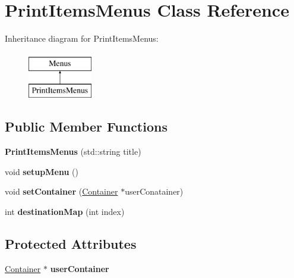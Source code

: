 \hypertarget{class_print_items_menus}{}\section{Print\+Items\+Menus Class Reference}
\label{class_print_items_menus}
Inheritance diagram for Print\+Items\+Menus\+:\begin{figure}[H]
\begin{center}
\leavevmode
\includegraphics[height=2.000000cm]{class_print_items_menus}
\end{center}
\end{figure}
\subsection*{Public Member Functions}
\begin{DoxyCompactItemize}
\item 
\hypertarget{class_print_items_menus_af496ac8b862f7608a91302afa17998e3}{}\label{class_print_items_menus_af496ac8b862f7608a91302afa17998e3} 
{\bfseries Print\+Items\+Menus} (std\+::string title)
\item 
\hypertarget{class_print_items_menus_a9f9aae634ad34d838e25cdd90af1bfae}{}\label{class_print_items_menus_a9f9aae634ad34d838e25cdd90af1bfae} 
void {\bfseries setup\+Menu} ()
\item 
\hypertarget{class_print_items_menus_a9d1c4174b1f26fc2f1dbd69e67f24d0b}{}\label{class_print_items_menus_a9d1c4174b1f26fc2f1dbd69e67f24d0b} 
void {\bfseries set\+Container} (\hyperlink{class_container}{Container} $\ast$user\+Conatainer)
\item 
\hypertarget{class_print_items_menus_a52a764f40dfb4d8f405842ccfc14586d}{}\label{class_print_items_menus_a52a764f40dfb4d8f405842ccfc14586d} 
int {\bfseries destination\+Map} (int index)
\end{DoxyCompactItemize}
\subsection*{Protected Attributes}
\begin{DoxyCompactItemize}
\item 
\hypertarget{class_print_items_menus_a8df03f0fb47059c5896b3761f5091eea}{}\label{class_print_items_menus_a8df03f0fb47059c5896b3761f5091eea} 
\hyperlink{class_container}{Container} $\ast$ {\bfseries user\+Container}
\end{DoxyCompactItemize}

